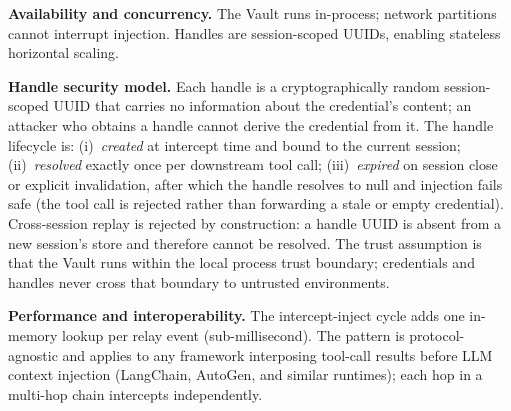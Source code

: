 \textbf{Availability and concurrency.} The Vault runs in-process; network
partitions cannot interrupt injection. Handles are session-scoped UUIDs,
enabling stateless horizontal scaling.

\textbf{Handle security model.} Each handle is a cryptographically random
session-scoped UUID that carries no information about the credential's
content; an attacker who obtains a handle cannot derive the credential from
it. The handle lifecycle is: (i)~\emph{created} at intercept time and bound
to the current session; (ii)~\emph{resolved} exactly once per downstream
tool call; (iii)~\emph{expired} on session close or explicit invalidation,
after which the handle resolves to null and injection fails safe (the tool
call is rejected rather than forwarding a stale or empty credential).
Cross-session replay is rejected by construction: a handle UUID is absent
from a new session's store and therefore cannot be resolved. The trust
assumption is that the Vault runs within the local process trust boundary;
credentials and handles never cross that boundary to untrusted environments.

\textbf{Performance and interoperability.} The intercept-inject cycle adds one
in-memory lookup per relay event (sub-millisecond). The pattern is
protocol-agnostic and applies to any framework interposing tool-call results
before LLM context injection (LangChain, AutoGen, and similar runtimes);
each hop in a multi-hop chain intercepts independently.
